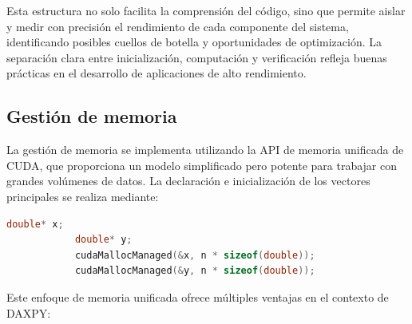         Esta estructura no solo facilita la comprensión del código, sino que permite aislar y medir con precisión el rendimiento de cada componente del sistema, identificando posibles cuellos de botella y oportunidades de optimización. La separación clara entre inicialización, computación y verificación refleja buenas prácticas en el desarrollo de aplicaciones de alto rendimiento.
        
    \subsection{Gestión de memoria}

        La gestión de memoria se implementa utilizando la API de memoria unificada de CUDA, que proporciona un modelo simplificado pero potente para trabajar con grandes volúmenes de datos. La declaración e inicialización de los vectores principales se realiza mediante:
        
        \begin{lstlisting}[language=C, caption={Uso de memoria unificada.}, gobble=8]
            double* x;
            double* y;
            cudaMallocManaged(&x, n * sizeof(double));
            cudaMallocManaged(&y, n * sizeof(double));
        \end{lstlisting}

        Este enfoque de memoria unificada ofrece múltiples ventajas en el contexto de DAXPY:

